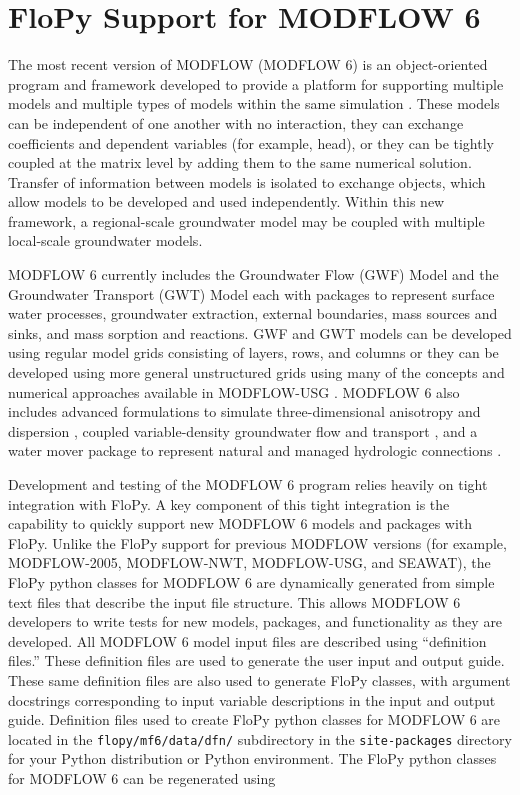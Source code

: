 \documentclass[11pt, oneside]{article}  	%
\begin{document}
\section{FloPy Support for MODFLOW 6}

The most recent version of MODFLOW (MODFLOW 6) is an object-oriented program and framework developed to provide a platform for supporting multiple models and multiple types of models within the same simulation \citep{modflow6gwf, modflow6framework, morway2021use}. These models can be independent of one another with no interaction, they can exchange coefficients and dependent variables (for example, head), or they can be tightly coupled at the matrix level by adding them to the same numerical solution. Transfer of information between models is isolated to exchange objects, which allow models to be developed and used independently. Within this new framework, a regional-scale groundwater model may be coupled with multiple local-scale groundwater models. 

MODFLOW 6 currently includes the Groundwater Flow (GWF) Model and the Groundwater Transport (GWT) Model each with packages to represent surface water processes, groundwater extraction, external boundaries, mass sources and sinks, and mass sorption and reactions. GWF and GWT models can be developed using regular model grids consisting of layers, rows, and columns or they can be developed using more general unstructured grids using many of the concepts and numerical approaches available in MODFLOW-USG \citep{modflowusg}. MODFLOW 6 also includes advanced formulations to simulate three-dimensional anisotropy and dispersion \citep{modflow6xt3d}, coupled variable-density groundwater flow and transport \citep{langevin2020hydraulic}, and a water mover package to represent natural and managed hydrologic connections \citep{morway2021use}.

Development and testing of the MODFLOW 6 program relies heavily on tight integration with FloPy. A key component of this tight integration is the capability to quickly support new MODFLOW 6 models and packages with FloPy. Unlike the FloPy support for previous MODFLOW versions (for example, MODFLOW-2005, MODFLOW-NWT, MODFLOW-USG, and SEAWAT), the FloPy python classes for MODFLOW 6 are dynamically generated from simple text files that describe the input file structure. This allows MODFLOW 6 developers to write tests for new models, packages, and functionality as they are developed. All MODFLOW 6 model input files are described using ``definition files.'' These definition files are used to generate the user input and output guide. These same definition files are also used to generate FloPy classes, with argument docstrings corresponding to input variable descriptions in the input and output guide. Definition files used to create FloPy python classes for MODFLOW 6 are located in the \texttt{flopy/mf6/data/dfn/} subdirectory in the \texttt{site-packages} directory for your Python distribution or Python environment. The FloPy python classes for MODFLOW 6 can be regenerated using 
\end{document}

